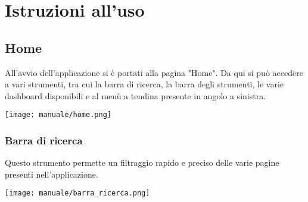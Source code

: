 \section{Istruzioni all'uso}
\subsection{Home}
All'avvio dell'applicazione si è portati alla pagina "Home". Da qui si può accedere a vari strumenti, tra cui la barra di ricerca, la barra degli strumenti, le varie dashboard disponibili e al menù a tendina presente in angolo a sinistra.
\begin{center}
    \texttt{[image: manuale/home.png]}
\end{center}
\newpage
\subsubsection{Barra di ricerca}
Questo strumento permette un filtraggio rapido e preciso delle varie pagine presenti nell'applicazione. 
\begin{center}
    \texttt{[image: manuale/barra\_ricerca.png]}
\end{center}

